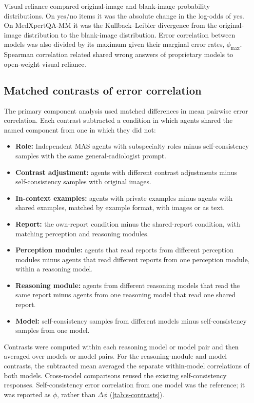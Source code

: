Visual reliance compared original-image and blank-image probability distributions. On yes/no items it was the absolute change in the log-odds of yes. On MedXpertQA-MM it was the Kullback--Leibler divergence from the original-image distribution to the blank-image distribution. Error correlation between models was also divided by its maximum given their marginal error rates, $\phi_{\max}$. Spearman correlation related shared wrong answers of proprietary models to open-weight visual reliance.

\subsection{Matched contrasts of error correlation}
The primary component analysis used matched differences in mean pairwise error correlation. Each contrast subtracted a condition in which agents shared the named component from one in which they did not:
\begin{itemize}
    \item \textbf{Role:} Independent MAS agents with subspecialty roles minus self-consistency samples with the same general-radiologist prompt.
    \item \textbf{Contrast adjustment:} agents with different contrast adjustments minus self-consistency samples with original images.
    \item \textbf{In-context examples:} agents with private examples minus agents with shared examples, matched by example format, with images or as text.
    \item \textbf{Report:} the own-report condition minus the shared-report condition, with matching perception and reasoning modules.
    \item \textbf{Perception module:} agents that read reports from different perception modules minus agents that read different reports from one perception module, within a reasoning model.
    \item \textbf{Reasoning module:} agents from different reasoning models that read the same report minus agents from one reasoning model that read one shared report.
    \item \textbf{Model:} self-consistency samples from different models minus self-consistency samples from one model.
\end{itemize}

Contrasts were computed within each reasoning model or model pair and then averaged over models or model pairs. For the reasoning-module and model contrasts, the subtracted mean averaged the separate within-model correlations of both models. Cross-model comparisons reused the existing self-consistency responses. Self-consistency error correlation from one model was the reference; it was reported as $\phi$, rather than $\Delta\phi$ (\cref{tab:s-contrasts}).

